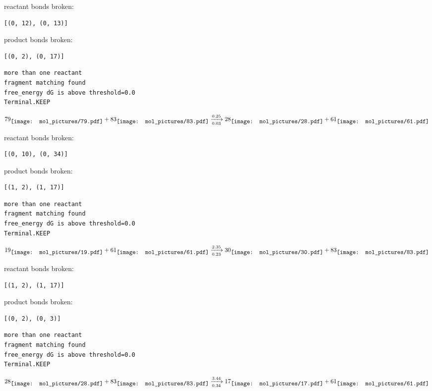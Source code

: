 \documentclass{article}
\begin{document}
reactant bonds broken:\begin{verbatim}
[(0, 12), (0, 13)]
\end{verbatim}
product bonds broken:\begin{verbatim}
[(0, 2), (0, 17)]
\end{verbatim}




\vspace{1cm}
\begin{verbatim}
more than one reactant
fragment matching found
free_energy dG is above threshold=0.0
Terminal.KEEP
\end{verbatim}
$$
79
\raisebox{-.5\height}{\texttt{[image: mol\_pictures/79.pdf]}}
+
83
\raisebox{-.5\height}{\texttt{[image: mol\_pictures/83.pdf]}}
\xrightarrow[0.03]{0.25}
28
\raisebox{-.5\height}{\texttt{[image: mol\_pictures/28.pdf]}}
+
61
\raisebox{-.5\height}{\texttt{[image: mol\_pictures/61.pdf]}}
$$


reactant bonds broken:\begin{verbatim}
[(0, 10), (0, 34)]
\end{verbatim}
product bonds broken:\begin{verbatim}
[(1, 2), (1, 17)]
\end{verbatim}




\vspace{1cm}
\begin{verbatim}
more than one reactant
fragment matching found
free_energy dG is above threshold=0.0
Terminal.KEEP
\end{verbatim}
$$
19
\raisebox{-.5\height}{\texttt{[image: mol\_pictures/19.pdf]}}
+
61
\raisebox{-.5\height}{\texttt{[image: mol\_pictures/61.pdf]}}
\xrightarrow[0.23]{2.35}
30
\raisebox{-.5\height}{\texttt{[image: mol\_pictures/30.pdf]}}
+
83
\raisebox{-.5\height}{\texttt{[image: mol\_pictures/83.pdf]}}
$$


reactant bonds broken:\begin{verbatim}
[(1, 2), (1, 17)]
\end{verbatim}
product bonds broken:\begin{verbatim}
[(0, 2), (0, 3)]
\end{verbatim}




\vspace{1cm}
\begin{verbatim}
more than one reactant
fragment matching found
free_energy dG is above threshold=0.0
Terminal.KEEP
\end{verbatim}
$$
28
\raisebox{-.5\height}{\texttt{[image: mol\_pictures/28.pdf]}}
+
83
\raisebox{-.5\height}{\texttt{[image: mol\_pictures/83.pdf]}}
\xrightarrow[0.34]{3.44}
17
\raisebox{-.5\height}{\texttt{[image: mol\_pictures/17.pdf]}}
+
61
\raisebox{-.5\height}{\texttt{[image: mol\_pictures/61.pdf]}}
$$
\end{document}

